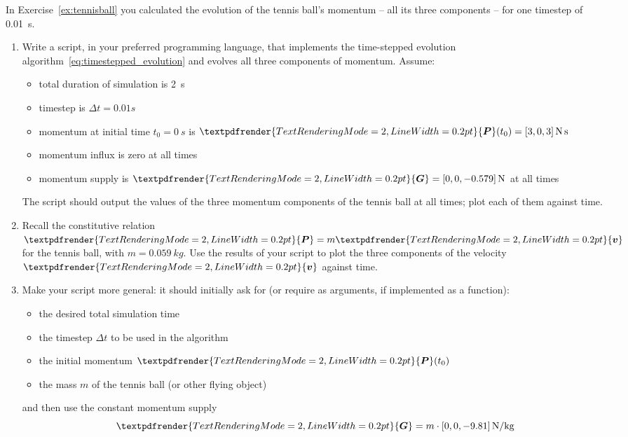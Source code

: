 \documentclass[a4paper,12pt,%
onecolumn,oneside,%
british%
]{memoir}
\renewcommand*{\bm}[1]{\textpdfrender{TextRenderingMode=2,LineWidth=0.2pt}{\boldsymbol{#1}}}
\newcommand*{\incr}{\Delta}%
\renewcommand*{\|}[1][]{\nonscript\:#1\vert\nonscript\:\mathopen{}}
\newcommand*{\yv}{\bm{v}}
\newcommand*{\yti}{t_{0}}
\newcommand*{\Dt}{\incr t}
\newcommand*{\ym}{m}%
\newcommand*{\yP}{\bm{P}}
\newcommand*{\yG}{\bm{G}}
\begin{document}
\begin{exercise}[label={ex:tennisball2}]
  In Exercise~\ref{ex:tennisball} you calculated the evolution of the tennis ball's momentum -- all its three components -- for one timestep of \qty{0.01}{s}.

  \begin{enumerate}[exerc]
  \item Write a script, in your preferred programming language, that implements the time-stepped evolution algorithm~\eqref{eq:timestepped_evolution} and evolves all three components of momentum. Assume:
    \begin{itemize}[nosep]
    \item total duration of simulation is \qty{2}{s}
    \item timestep is $\Dt={0.01}{s}$
    \item momentum at initial time $\yti=\qty{0}{s}$ is $\yP(\yti) = [3,0,3]\,\unit{N\,s}$
    \item momentum influx is zero at all times
    \item  momentum supply is $\yG=[0,0,\num{-0.579}]\,\unit{N}$ at all times
    \end{itemize}
    The script should output the values of the three momentum components of the tennis ball at all times; plot each of them against time.

    \smallskip

  \item Recall the constitutive relation $\yP=\ym\yv$ for the tennis ball, with $\ym = \qty{0.059}{kg}$. Use the results of your script to plot the three components of the velocity $\yv$ against time.

    \smallskip

  \item Make your script more general: it should initially ask for (or require as arguments, if implemented as a function):
    \begin{itemize}[nosep]
    \item the desired total simulation time
    \item the timestep $\Dt$ to be used in the algorithm
    \item the initial momentum $\yP(\yti)$
    \item the mass $\ym$ of the tennis ball (or other flying object)
    \end{itemize}
    and then use the constant momentum supply
    \begin{equation*}
      \yG = \ym\cdot [0,0,-9.81]\,\unit{N/kg}
    \end{equation*}
  \end{enumerate}
\end{exercise}
\end{document}
